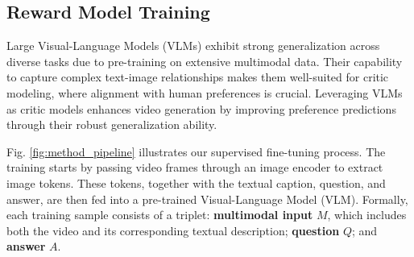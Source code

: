 \subsection{Reward Model Training}

Large Visual-Language Models (VLMs) exhibit strong generalization across diverse tasks due to pre-training on extensive multimodal data. Their capability to capture complex text-image relationships makes them well-suited for critic modeling, where alignment with human preferences is crucial. Leveraging VLMs as critic models enhances video generation by improving preference predictions through their robust generalization ability.




Fig. \ref{fig:method_pipeline} illustrates our supervised fine-tuning process. The training starts by passing video frames through an image encoder to extract image tokens. These tokens, together with the textual caption, question, and answer, are then fed into a pre-trained Visual-Language Model (VLM). Formally, each training sample consists of a triplet: \textbf{multimodal input} $M$, which includes both the video and its corresponding textual description; \textbf{question} $Q$; and \textbf{answer} $A$.

